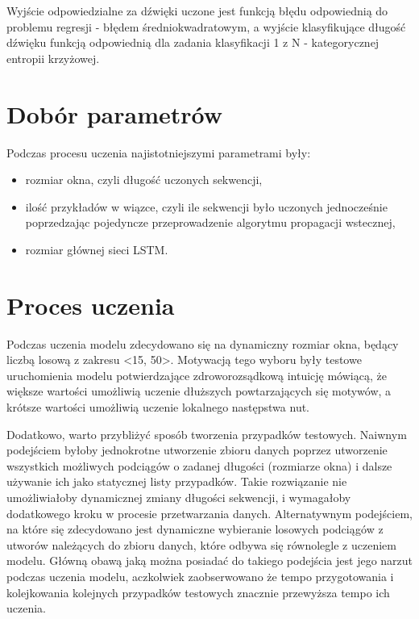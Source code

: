 {{        Wyjście odpowiedzialne za dźwięki uczone jest funkcją błędu odpowiednią do problemu 
        regresji - błędem średniokwadratowym, a\,\,wyjście klasyfikujące długość dźwięku funkcją odpowiednią
        dla zadania klasyfikacji 1 z\,\,N - kategorycznej entropii krzyżowej.
    }

    \section{Dobór parametrów}
    {
        Podczas procesu uczenia najistotniejszymi parametrami były:
        \begin{itemize}
            \setlength\itemsep{-0.5em}
            \item rozmiar okna, czyli długość uczonych sekwencji,
            \item ilość przykładów w\,\,wiązce, czyli ile sekwencji było uczonych jednocześnie
            poprzedzając pojedyncze przeprowadzenie algorytmu propagacji wstecznej,
            \item rozmiar głównej sieci LSTM.
        \end{itemize}
    }

    \section{Proces uczenia}
    {
        Podczas uczenia modelu zdecydowano się na dynamiczny rozmiar okna,
        będący liczbą losową z\,\,zakresu <15, 50>. Motywacją tego wyboru były testowe 
        uruchomienia modelu potwierdzające zdroworozsądkową intuicję mówiącą, że większe wartości
        umożliwią uczenie dłuższych powtarzających się motywów, a\,\,krótsze wartości umożliwią uczenie lokalnego następstwa nut.

        Dodatkowo, warto przybliżyć sposób tworzenia przypadków testowych. Naiwnym podejściem byłoby
        jednokrotne utworzenie zbioru danych poprzez utworzenie wszystkich możliwych podciągów o\,\,zadanej
        długości (rozmiarze okna) i\,\,dalsze używanie ich jako statycznej listy przypadków. 
        Takie rozwiązanie nie umożliwiałoby dynamicznej zmiany długości sekwencji, i\,\,wymagałoby dodatkowego 
        kroku w\,\,procesie przetwarzania danych. Alternatywnym podejściem, na które się zdecydowano jest dynamiczne
        wybieranie losowych podciągów z\,\,utworów należących do zbioru danych, które odbywa się równolegle z\,\,uczeniem modelu. 
        Główną obawą jaką można posiadać do takiego podejścia jest jego narzut podczas uczenia modelu, 
        aczkolwiek zaobserwowano że tempo przygotowania i\,\,kolejkowania kolejnych przypadków testowych znacznie przewyższa tempo ich uczenia.

}}
